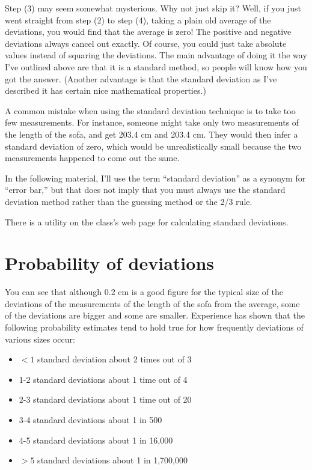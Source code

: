 	Step (3) may seem somewhat mysterious. Why not just skip
it? Well, if you just went straight from step (2) to step
(4), taking a plain old average of the deviations, you would
find that the average is zero! The positive and negative
deviations always cancel out exactly. Of course, you could
just take absolute values instead of squaring the deviations.
The main advantage of doing it the way I've outlined above
are that it is a standard method, so people will know how
you got the answer. (Another advantage is that the standard
deviation as I've described it has certain nice mathematical properties.)

	A common mistake when using the standard deviation
technique is to take too few measurements. For instance,
someone might take only two measurements of the length of
the sofa, and get 203.4 cm and 203.4 cm. They would then
infer a standard deviation of zero, which would be
unrealistically small because the two measurements happened
to come out the same.

	In the following material, I'll use the term ``standard
deviation'' as a synonym for ``error bar,'' but that does
not imply that you must always use the standard deviation
method rather than the guessing method or the 2/3 rule.

There is a utility on the class's web page for calculating
standard deviations.

\section*{Probability of deviations}\label{probability-of-deviations}
	You can see that although 0.2 cm is a good figure for the
typical size of the deviations of the measurements of the
length of the sofa from the average, some of the deviations
are bigger and some are smaller. Experience has shown that
the following probability estimates tend to hold true for
how frequently deviations of various sizes occur:
\begin{itemize}
	\item[] $<1$ standard deviation	about 2 times out of 3

	\item[] 1-2 standard deviations	about 1 time out of 4

	\item[] 2-3 standard deviations	about 1 time out of 20

	\item[] 3-4 standard deviations	about 1 in 500

	\item[] 4-5 standard deviations	about 1 in 16,000

	\item[] $>5$ standard deviations about 1 in 1,700,000
\end{itemize}

